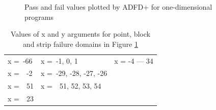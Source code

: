 \begin{figure} [H]
\centering
{}
\caption{Pass and fail values plotted by ADFD+ for one-dimensional programs}

\label{fig:failureDomainsOneDimension_6}
\end{figure}
\begin{table}[h]
\caption{Values of x and y arguments for point, block and strip failure domains in Figure \ref{fig:failureDomainsOneDimension_6}}
\bigskip
\centering
{\renewcommand{\arraystretch}{1.3}
\begin{tabular}{|l|l|l|}
\hline
x =~-66			&	x =~-1, 0, 1				&	x = -4 --- 34 	\\	
x =~~-2		 	&	x =~-29, -28, -27, -26	&					\\	
x =~~51 		&	x =~~51, 52, 53, 54 		&					\\
x =~~23 		& 	 						& 					\\
\hline
\end{tabular}
}
\bigskip
\label{table:failureDomains_6}
\end{table}
